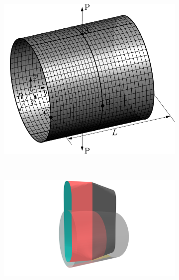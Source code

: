 \begin{figure}[h]
	\center
	\begin{subfigure}[b]{\textwidth}
		\centering
		\includegraphics[width=.6\textwidth]{cylindrical_configuration}
		\caption{}\label{fig:cylindrical_pull_config}
	\end{subfigure}
	\\\hspace{1em}
	\begin{subfigure}[b]{.47\textwidth}
		\centering
		\includegraphics[scale=.2,trim={18cm 3cm 18cm 0cm},clip]{cylindrical_deformed}
		\caption{}
	\end{subfigure}

\end{figure}

